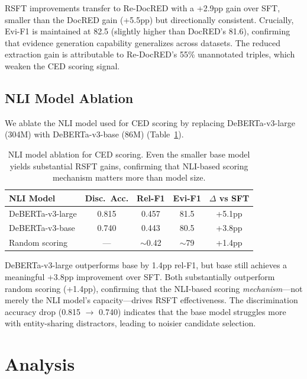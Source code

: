 \documentclass[11pt,a4paper]{article}
\begin{document}
RSFT improvements transfer to Re-DocRED with a +2.9pp gain over SFT, smaller than the DocRED gain (+5.5pp) but directionally consistent.
Crucially, Evi-F1 is maintained at 82.5 (slightly higher than DocRED's 81.6), confirming that evidence generation capability generalizes across datasets.
The reduced extraction gain is attributable to Re-DocRED's 55\% unannotated triples, which weaken the CED scoring signal.

\subsection{NLI Model Ablation}
\label{sec:nli_ablation}

We ablate the NLI model used for CED scoring by replacing DeBERTa-v3-large (304M) with DeBERTa-v3-base (86M) (Table~\ref{tab:nli}).

\begin{table}[t]
\centering
\small
\begin{tabular}{lcccc}
\toprule
\textbf{NLI Model} & \textbf{Disc.\ Acc.} & \textbf{Rel-F1} & \textbf{Evi-F1} & \textbf{$\Delta$ vs SFT} \\
\midrule
DeBERTa-v3-large & 0.815 & 0.457 & 81.5 & +5.1pp \\
DeBERTa-v3-base & 0.740 & 0.443 & 80.5 & +3.8pp \\
Random scoring & --- & $\sim$0.42 & $\sim$79 & +1.4pp \\
\bottomrule
\end{tabular}
\caption{NLI model ablation for CED scoring. Even the smaller base model yields substantial RSFT gains, confirming that NLI-based scoring mechanism matters more than model size.}
\label{tab:nli}
\end{table}

DeBERTa-v3-large outperforms base by 1.4pp rel-F1, but base still achieves a meaningful +3.8pp improvement over SFT.
Both substantially outperform random scoring (+1.4pp), confirming that the NLI-based scoring \emph{mechanism}---not merely the NLI model's capacity---drives RSFT effectiveness.
The discrimination accuracy drop (0.815 $\to$ 0.740) indicates that the base model struggles more with entity-sharing distractors, leading to noisier candidate selection.

\section{Analysis}
\end{document}
